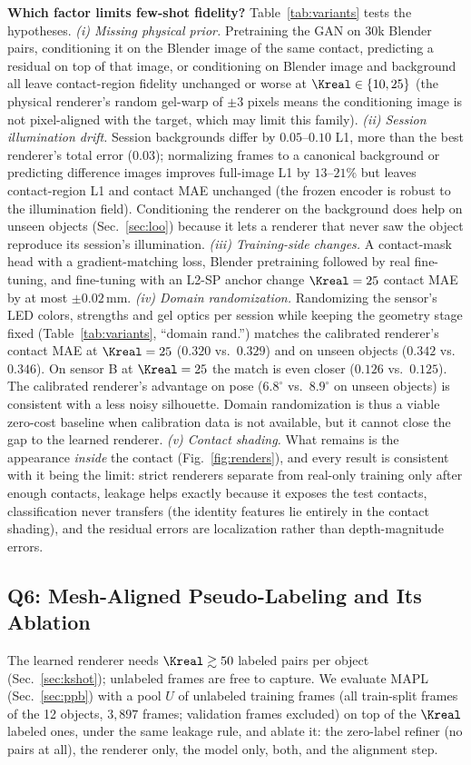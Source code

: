 \noindent\textbf{Which factor limits few-shot fidelity?}
\label{sec:negative}
Table~\ref{tab:variants} tests the hypotheses.
\emph{(i) Missing physical prior.} Pretraining the GAN on $30$k Blender pairs, conditioning it on the Blender image of the same contact, predicting a residual on top of that image, or conditioning on Blender image and background all leave contact-region fidelity unchanged or worse at $\Kreal\in\{10,25\}$ (the physical renderer's random gel-warp of $\pm3$ pixels means the conditioning image is not pixel-aligned with the target, which may limit this family).
\emph{(ii) Session illumination drift.} Session backgrounds differ by $0.05$--$0.10$ L1, more than the best renderer's total error ($0.03$); normalizing frames to a canonical background or predicting difference images improves full-image L1 by $13$--$21\%$ but leaves contact-region L1 and contact MAE unchanged (the frozen encoder is robust to the illumination field). Conditioning the renderer on the background does help on unseen objects (Sec.~\ref{sec:loo}) because it lets a renderer that never saw the object reproduce its session's illumination.
\emph{(iii) Training-side changes.} A contact-mask head with a gradient-matching loss, Blender pretraining followed by real fine-tuning, and fine-tuning with an L2-SP anchor change $\Kreal=25$ contact MAE by at most $\pm0.02\,$mm.
\emph{(iv) Domain randomization.} Randomizing the sensor's LED colors, strengths and gel optics per session while keeping the geometry stage fixed (Table~\ref{tab:variants}, ``domain rand.'') matches the calibrated renderer's contact MAE at $\Kreal=25$ ($0.320$ vs.\ $0.329$) and on unseen objects ($0.342$ vs.\ $0.346$). On sensor B at $\Kreal=25$ the match is even closer ($0.126$ vs.\ $0.125$). The calibrated renderer's advantage on pose ($6.8^\circ$ vs.\ $8.9^\circ$ on unseen objects) is consistent with a less noisy silhouette. Domain randomization is thus a viable zero-cost baseline when calibration data is not available, but it cannot close the gap to the learned renderer.
\emph{(v) Contact shading.} What remains is the appearance \emph{inside} the contact (Fig.~\ref{fig:renders}), and every result is consistent with it being the limit: strict renderers separate from real-only training only after enough contacts, leakage helps exactly because it exposes the test contacts, classification never transfers (the identity features lie entirely in the contact shading), and the residual errors are localization rather than depth-magnitude errors.

\subsection{Q6: Mesh-Aligned Pseudo-Labeling and Its Ablation}
\label{sec:unlabeled}
The learned renderer needs $\Kreal\gtrsim50$ labeled pairs per object (Sec.~\ref{sec:kshot}); unlabeled frames are free to capture. We evaluate MAPL (Sec.~\ref{sec:ppb}) with a pool $U$ of unlabeled training frames (all train-split frames of the 12 objects, $3{,}897$ frames; validation frames excluded) on top of the $\Kreal$ labeled ones, under the same leakage rule, and ablate it: the zero-label refiner (no pairs at all), the renderer only, the model only, both, and the alignment step.

